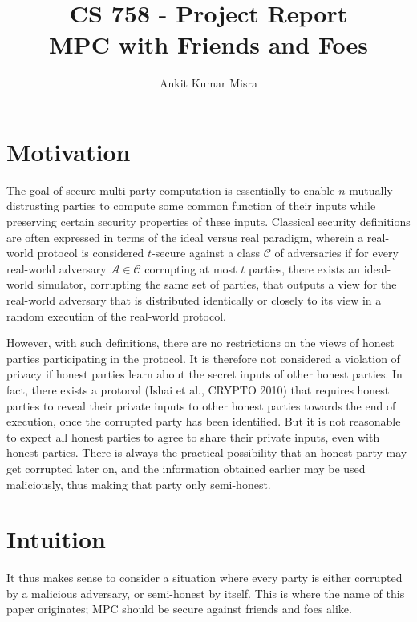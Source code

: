 \documentclass[11pt, a4paper]{article}
\title{CS 758 - Project Report\\
        MPC with Friends and Foes}
\author{Ankit Kumar Misra}
\theoremstyle{definition}
\theoremstyle{remark}
\begin{document}
\maketitle

\section{Motivation}

The goal of secure multi-party computation is essentially to enable $n$ mutually distrusting parties to compute some common function of their inputs while preserving certain security properties of these inputs. Classical security definitions are often expressed in terms of the ideal versus real paradigm, wherein a real-world protocol is considered $t$-secure against a class $\mathcal{C}$ of adversaries if for every real-world adversary $\mathcal{A}\in\mathcal{C}$ corrupting at most $t$ parties, there exists an ideal-world simulator, corrupting the same set of parties, that outputs a view for the real-world adversary that is distributed identically or closely to its view in a random execution of the real-world protocol.

\medskip

However, with such definitions, there are no restrictions on the views of honest parties participating in the protocol. It is therefore not considered a violation of privacy if honest parties learn about the secret inputs of other honest parties. In fact, there exists a protocol (Ishai et al., CRYPTO 2010) that requires honest parties to reveal their private inputs to other honest parties towards the end of execution, once the corrupted party has been identified. But it is not reasonable to expect all honest parties to agree to share their private inputs, even with honest parties. There is always the practical possibility that an honest party may get corrupted later on, and the information obtained earlier may be used maliciously, thus making that party only semi-honest.

\section{Intuition}

It thus makes sense to consider a situation where every party is either corrupted by a malicious adversary, or semi-honest by itself. This is where the name of this paper originates; MPC should be secure against friends and foes alike.

\medskip
\end{document}
